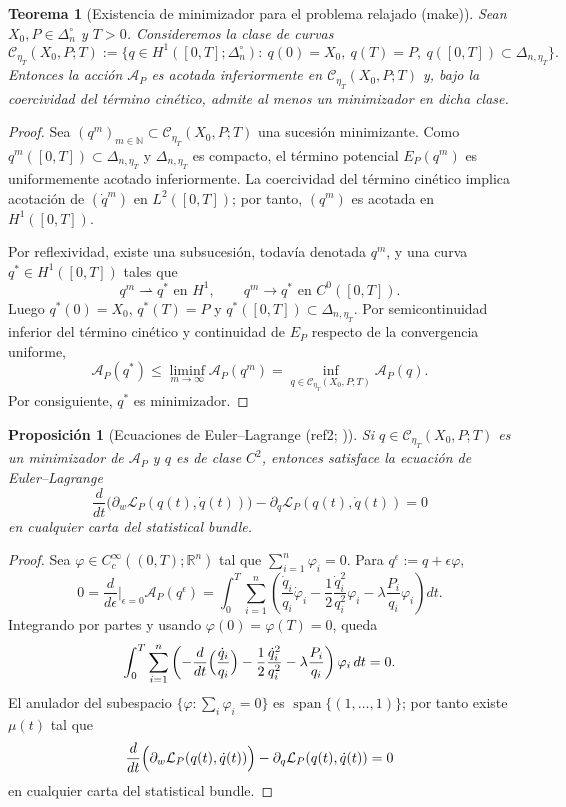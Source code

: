 ﻿\documentclass[12pt]{article}
\newcommand{\fuente}[1]{\textnormal{(#1)}}
\newcommand{\fuentecite}[2]{\textnormal{(#1; \citealp{#2})}}
\newtheorem{proposicion}{Proposición}[section]
\newtheorem{teorema}{Teorema}[section]
\begin{document}
\begin{teorema}[Existencia de minimizador para el problema relajado \fuente{make}]
Sean \(X_0,P\in\Delta_n^\circ\) y \(T>0\). Consideremos la clase de curvas
\[
\mathcal C_{\eta_T}(X_0,P;T)
:=
\bigl\{q\in H^1([0,T];\Delta_n^\circ):\ q(0)=X_0,\ q(T)=P,\ q([0,T])\subset \Delta_{n,\eta_T}\bigr\}.
\]
Entonces la acción \(\mathcal A_P\) es acotada inferiormente en \(\mathcal C_{\eta_T}(X_0,P;T)\) y, bajo la coercividad del término cinético, admite al menos un minimizador en dicha clase.
\end{teorema}
\begin{proof}
Sea \((q^m)_{m\in\mathbb N}\subset \mathcal C_{\eta_T}(X_0,P;T)\) una sucesión minimizante. Como \(q^m([0,T])\subset\Delta_{n,\eta_T}\) y \(\Delta_{n,\eta_T}\) es compacto, el término potencial \(E_P(q^m)\) es uniformemente acotado inferiormente. La coercividad del término cinético implica acotación de \((\dot q^m)\) en \(L^2([0,T])\); por tanto, \((q^m)\) es acotada en \(H^1([0,T])\).

Por reflexividad, existe una subsucesión, todavía denotada \(q^m\), y una curva \(q^*\in H^1([0,T])\) tales que
\[
q^m\rightharpoonup q^* \text{ en } H^1,
\qquad
q^m\to q^* \text{ en } C^0([0,T]).
\]
Luego \(q^*(0)=X_0\), \(q^*(T)=P\) y \(q^*([0,T])\subset\Delta_{n,\eta_T}\). Por semicontinuidad inferior del término cinético y continuidad de \(E_P\) respecto de la convergencia uniforme,
\[
\mathcal A_P(q^*)\le \liminf_{m\to\infty}\mathcal A_P(q^m)=\inf_{q\in\mathcal C_{\eta_T}(X_0,P;T)}\mathcal A_P(q).
\]
Por consiguiente, \(q^*\) es minimizador.
\end{proof}

\begin{proposicion}[Ecuaciones de Euler--Lagrange \fuentecite{ref2}{Pistone2018Lagrangian}]
Si \(q\in \mathcal C_{\eta_T}(X_0,P;T)\) es un minimizador de \(\mathcal A_P\) y \(q\) es de clase \(C^2\), entonces satisface la ecuación de Euler--Lagrange
\[
\frac{d}{dt}\bigl(\partial_w \mathcal L_P(q(t),\dot q(t))\bigr)
-\partial_q \mathcal L_P(q(t),\dot q(t))=0
\]
en cualquier carta del statistical bundle.
\end{proposicion}
\begin{proof}
Sea \(\varphi\in C_c^\infty((0,T);\mathbb R^n)\) tal que \(\sum_{i=1}^n \varphi_i=0\). Para \(q^\epsilon:=q+\epsilon\varphi\),
\[
0=\frac{d}{d\epsilon}\Big|_{\epsilon=0}\mathcal A_P(q^\epsilon)
=\int_0^T \sum_{i=1}^n\left(
\frac{\dot q_i}{q_i}\dot\varphi_i
-\frac12\frac{\dot q_i^2}{q_i^2}\varphi_i
-\lambda\frac{P_i}{q_i}\varphi_i
\right)dt.
\]
Integrando por partes y usando \(\varphi(0)=\varphi(T)=0\), queda
\[
\int_0^T \sum_{i=1}^n \left(
-\frac{d}{dt}\Bigl(\frac{\dot q_i}{q_i}\Bigr)
-\frac12\frac{\dot q_i^2}{q_i^2}
-\lambda\frac{P_i}{q_i}
\right)\varphi_i\,dt=0.
\]
El anulador del subespacio \(\{\varphi:\sum_i\varphi_i=0\}\) es \(\operatorname{span}\{(1,\dots,1)\}\); por tanto existe \(\mu(t)\) tal que
\[
\frac{d}{dt}\Bigl(\partial_w\mathcal L_P(q(t),\dot q(t))\Bigr)-\partial_q\mathcal L_P(q(t),\dot q(t))=0
\]
en cualquier carta del statistical bundle.
\end{proof}
\end{document}
